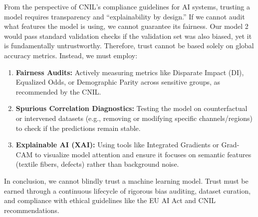 \documentclass{name}
\begin{document}
From the perspective of CNIL's compliance guidelines for AI systems, trusting a model requires transparency and ``explainability by design.'' If we cannot audit what features the model is using, we cannot guarantee its fairness. Our model 2 would pass standard validation checks if the validation set was also biased, yet it is fundamentally untrustworthy. Therefore, trust cannot be based solely on global accuracy metrics. Instead, we must employ:
\begin{enumerate}
    \item \textbf{Fairness Audits:} Actively measuring metrics like Disparate Impact (DI), Equalized Odds, or Demographic Parity across sensitive groups, as recommended by the CNIL.
    \item \textbf{Spurious Correlation Diagnostics:} Testing the model on counterfactual or intervened datasets (e.g., removing or modifying specific channels/regions) to check if the predictions remain stable.
    \item \textbf{Explainable AI (XAI):} Using tools like Integrated Gradients or Grad-CAM to visualize model attention and ensure it focuses on semantic features (textile fibers, defects) rather than background noise.
\end{enumerate}
In conclusion, we cannot blindly trust a machine learning model. Trust must be earned through a continuous lifecycle of rigorous bias auditing, dataset curation, and compliance with ethical guidelines like the EU AI Act and CNIL recommendations.

\printbibliography
\end{document}
